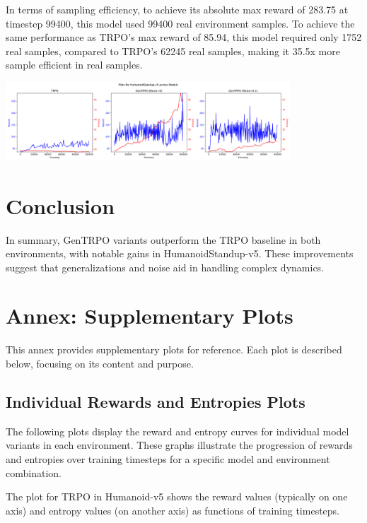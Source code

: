 \documentclass{svproc}
\begin{document}
In terms of sampling efficiency, to achieve its absolute max reward of 283.75 at timestep 99400, this model used 99400 real environment samples. To achieve the same performance as TRPO's max reward of 85.94, this model required only 1752 real samples, compared to TRPO's 62245 real samples, making it 35.5x more sample efficient in real samples.

\begin{center}
\includegraphics[width=0.8\textwidth]{grid_env_HumanoidStandup-v5.png}
\end{center}


\section{Conclusion}
In summary, GenTRPO variants outperform the TRPO baseline in both environments, with notable gains in HumanoidStandup-v5. These improvements suggest that generalizations and noise aid in handling complex dynamics.




\appendix
\section{Annex: Supplementary Plots}

This annex provides supplementary plots for reference. Each plot is described below, focusing on its content and purpose.

\subsection{Individual Rewards and Entropies Plots}
The following plots display the reward and entropy curves for individual model variants in each environment. These graphs illustrate the progression of rewards and entropies over training timesteps for a specific model and environment combination.

The plot for TRPO in Humanoid-v5 shows the reward values (typically on one axis) and entropy values (on another axis) as functions of training timesteps.
\end{document}

